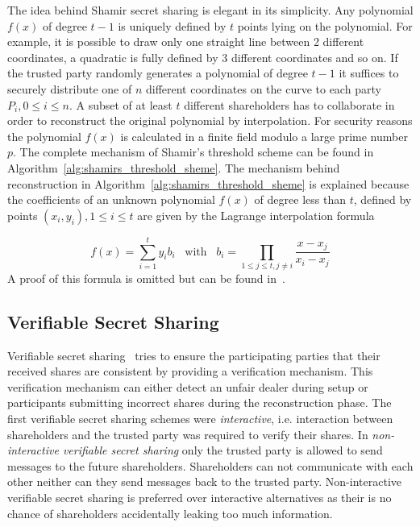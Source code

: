 The idea behind Shamir secret sharing is elegant in its simplicity. Any polynomial $f \left( x \right)$ of degree $t-1$ is uniquely defined by $t$ points lying on the polynomial. For example, it is possible to draw only one straight line between 2 different coordinates, a quadratic is fully defined by 3 different coordinates and so on. If the trusted party randomly generates a polynomial of degree $t-1$ it suffices to securely distribute one of $n$ different coordinates on the curve to each party $P_i, 0 \leq i \leq n$. A subset of at least $t$ different shareholders has to collaborate in order to reconstruct the original polynomial by interpolation. For security reasons the polynomial $f \left( x \right)$ is calculated in a finite field modulo a large prime number $p$. The complete mechanism of Shamir's threshold scheme can be found in Algorithm~\ref{alg:shamirs_threshold_sheme}. The mechanism behind reconstruction in Algorithm~\ref{alg:shamirs_threshold_sheme} is explained because the coefficients of an unknown polynomial $f \left( x \right)$ of degree less than $t$, defined by points $\left( x_i, y_i \right), 1 \leq i \leq t$ are given by the Lagrange interpolation formula

\begin{equation*}
 f \left( x \right) = \sum^t_{i=1}y_i b_i \; \; \; \textrm{with} \; \; \; b_i = \prod_{1 \leq j \leq t, j \neq i} \frac{x-x_j}{x_i-x_j}
\end{equation*}
A proof of this formula is omitted but can be found in~\cite{site:proofwiki_lagrange}.

\subsection{Verifiable Secret Sharing}
Verifiable secret sharing~\cite{art:ChorGMA85} tries to ensure the participating parties that their received shares are consistent by providing a verification mechanism. This verification mechanism can either detect an unfair dealer during setup or participants submitting incorrect shares during the reconstruction phase. The first verifiable secret sharing schemes were \textit{interactive}, i.e. interaction between shareholders and the trusted party was required to verify their shares. In \textit{non-interactive verifiable secret sharing} only the trusted party is allowed to send messages to the future shareholders. Shareholders can not communicate with each other neither can they send messages back to the trusted party. Non-interactive verifiable secret sharing is preferred over interactive alternatives as their is no chance of shareholders accidentally leaking too much information.

